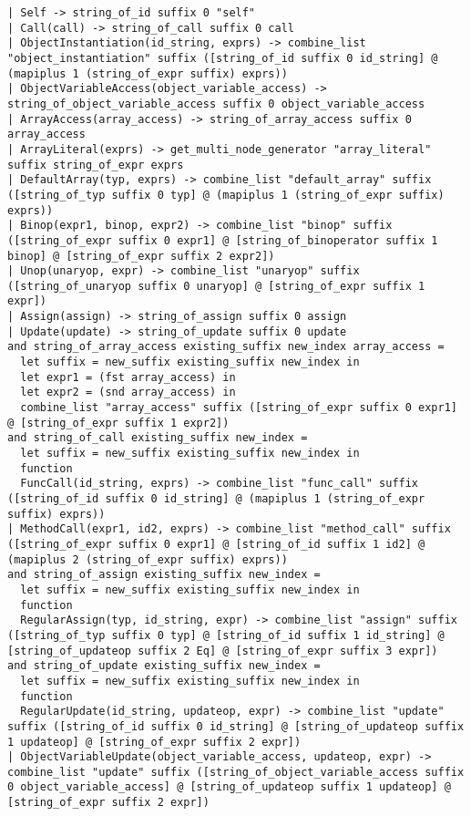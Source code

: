 \documentclass{article}
\begin{document}
\begin{verbatim}
| Self -> string_of_id suffix 0 "self"
| Call(call) -> string_of_call suffix 0 call
| ObjectInstantiation(id_string, exprs) -> combine_list "object_instantiation" suffix ([string_of_id suffix 0 id_string] @ (mapiplus 1 (string_of_expr suffix) exprs))
| ObjectVariableAccess(object_variable_access) -> string_of_object_variable_access suffix 0 object_variable_access
| ArrayAccess(array_access) -> string_of_array_access suffix 0 array_access
| ArrayLiteral(exprs) -> get_multi_node_generator "array_literal" suffix string_of_expr exprs
| DefaultArray(typ, exprs) -> combine_list "default_array" suffix ([string_of_typ suffix 0 typ] @ (mapiplus 1 (string_of_expr suffix) exprs))
| Binop(expr1, binop, expr2) -> combine_list "binop" suffix ([string_of_expr suffix 0 expr1] @ [string_of_binoperator suffix 1 binop] @ [string_of_expr suffix 2 expr2])
| Unop(unaryop, expr) -> combine_list "unaryop" suffix ([string_of_unaryop suffix 0 unaryop] @ [string_of_expr suffix 1 expr])
| Assign(assign) -> string_of_assign suffix 0 assign
| Update(update) -> string_of_update suffix 0 update
and string_of_array_access existing_suffix new_index array_access =
  let suffix = new_suffix existing_suffix new_index in
  let expr1 = (fst array_access) in
  let expr2 = (snd array_access) in
  combine_list "array_access" suffix ([string_of_expr suffix 0 expr1] @ [string_of_expr suffix 1 expr2])
and string_of_call existing_suffix new_index =
  let suffix = new_suffix existing_suffix new_index in
  function
  FuncCall(id_string, exprs) -> combine_list "func_call" suffix ([string_of_id suffix 0 id_string] @ (mapiplus 1 (string_of_expr suffix) exprs))
| MethodCall(expr1, id2, exprs) -> combine_list "method_call" suffix ([string_of_expr suffix 0 expr1] @ [string_of_id suffix 1 id2] @ (mapiplus 2 (string_of_expr suffix) exprs))
and string_of_assign existing_suffix new_index =
  let suffix = new_suffix existing_suffix new_index in
  function
  RegularAssign(typ, id_string, expr) -> combine_list "assign" suffix ([string_of_typ suffix 0 typ] @ [string_of_id suffix 1 id_string] @ [string_of_updateop suffix 2 Eq] @ [string_of_expr suffix 3 expr])
and string_of_update existing_suffix new_index =
  let suffix = new_suffix existing_suffix new_index in
  function
  RegularUpdate(id_string, updateop, expr) -> combine_list "update" suffix ([string_of_id suffix 0 id_string] @ [string_of_updateop suffix 1 updateop] @ [string_of_expr suffix 2 expr])
| ObjectVariableUpdate(object_variable_access, updateop, expr) -> combine_list "update" suffix ([string_of_object_variable_access suffix 0 object_variable_access] @ [string_of_updateop suffix 1 updateop] @ [string_of_expr suffix 2 expr])

\end{verbatim}
\end{document}

